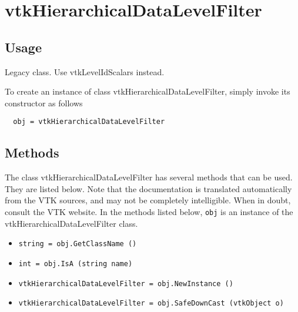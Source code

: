 \section{vtkHierarchicalDataLevelFilter}

\subsection{Usage}

 Legacy class. Use vtkLevelIdScalars instead.


To create an instance of class vtkHierarchicalDataLevelFilter, simply
invoke its constructor as follows
\begin{verbatim}
  obj = vtkHierarchicalDataLevelFilter
\end{verbatim}
\subsection{Methods}

The class vtkHierarchicalDataLevelFilter has several methods that can be used.
  They are listed below.
Note that the documentation is translated automatically from the VTK sources,
and may not be completely intelligible.  When in doubt, consult the VTK website.
In the methods listed below, \verb|obj| is an instance of the vtkHierarchicalDataLevelFilter class.
\begin{itemize}
\item  \verb|string = obj.GetClassName ()|

\item  \verb|int = obj.IsA (string name)|

\item  \verb|vtkHierarchicalDataLevelFilter = obj.NewInstance ()|

\item  \verb|vtkHierarchicalDataLevelFilter = obj.SafeDownCast (vtkObject o)|

\end{itemize}
